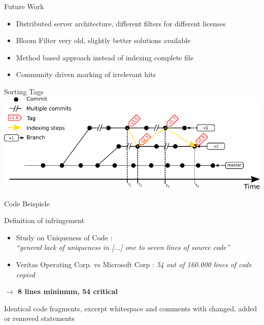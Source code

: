 \begin{frame}{Future Work}
	\begin{itemize}
		\item Distributed server architecture, different filters for different licenses
		\item Bloom Filter very old, slightly better solutions available
		\item Method based approach instead of indexing complete file
		\item Community driven marking of irrelevant hits
	\end{itemize}
\end{frame}


\begin{frame}{Sorting Tags}
	\centering
	\includegraphics[width=\linewidth]{../written/figures/tag_sort.pdf}
\end{frame}

\begin{frame}
	Code Beispiele 
\end{frame}

\begin{frame}{Definition of infringement}
\begin{itemize}
	\item Study on Uniqueness of Code \cite{2010-gabel-su-source-code-uniqueness}:\\
	\textit{\enquote{general lack of uniqueness in [...] one to seven lines of source code}}
	\item Veritas Operating Corp. vs Microsoft Corp \cite{mertzel2008copying}:
	\textit{54 out of 160.000 lines of code copied}
\end{itemize}

\begin{center}
	\textbf{$\rightarrow$ 8 lines minimum, 54 critical}
\end{center}
Identical code fragments, excerpt whitespace and comments with changed, added or removed statements
\end{frame}